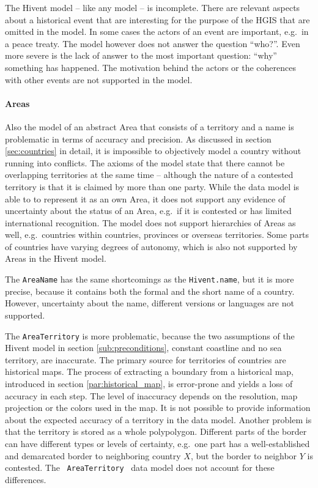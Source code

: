 The Hivent model -- like any model -- is incomplete. There are relevant aspects about a historical event that are interesting for the purpose of the HGIS that are omitted in the model. In some cases the actors of an event are important, e.g.\ in a peace treaty. The model however does not answer the question ``who?''. Even more severe is the lack of answer to the most important question: ``why'' something has happened. The motivation behind the actors or the coherences with other events are not supported in the model.


\paragraph{Areas} %
\label{par:evaluation_areas}

Also the model of an abstract Area that consists of a territory and a name is problematic in terms of accuracy and precision. As discussed in section \ref{sec:countries} in detail, it is impossible to objectively model a country without running into conflicts.
The axioms of the model state that there cannot be overlapping territories at the same time -- although the nature of a contested territory is that it is claimed by more than one party. While the data model is able to to represent it as an own Area, it does not support any evidence of uncertainty about the status of an Area, e.g.\ if it is contested or has limited international recognition.
The model does not support hierarchies of Areas as well, e.g.\ countries within countries, provinces or overseas territories. Some parts of countries have varying degrees of autonomy, which is also not supported by Areas in the Hivent model.

The \texttt{AreaName} has the same shortcomings as the \texttt{Hivent.name}, but it is more precise, because it contains both the formal and the short name of a country. However, uncertainty about the name, different versions or languages are not supported.

\newpage
The \texttt{AreaTerritory} is more problematic, because the two assumptions of the Hivent model in section \ref{sub:preconditions}, constant coastline and no sea territory, are inaccurate. The primary source for territories of countries are historical maps. The process of extracting a boundary from a historical map, introduced in section \ref{par:historical_map}, is error-prone and yields a loss of accuracy in each step. The level of inaccuracy depends on the resolution, map projection or the colors used in the map.
It is not possible to provide information about the expected accuracy of a territory in the data model. Another problem is that the territory is stored as a whole polypolygon. Different parts of the border can have different types or levels of certainty, e.g.\ one part has a well-established and demarcated border to neighboring country $X$, but the border to neighbor $Y$ is contested. The ~\texttt{AreaTerritory}~ data model does not account for these differences.

